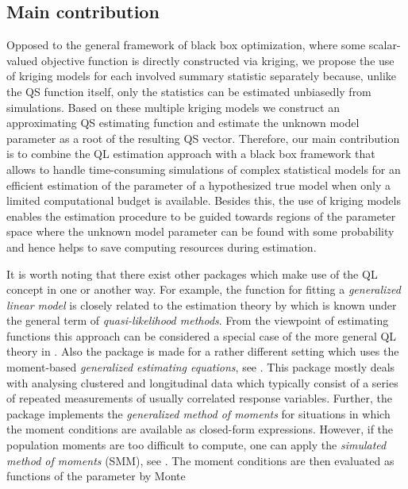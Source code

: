 \subsection{Main contribution}
Opposed to the general framework of black box optimization, where
some scalar-valued objective function is directly constructed via
kriging, we propose the use of kriging models for each involved summary
statistic separately because, unlike the QS function itself, only the statistics can be estimated
unbiasedly from simulations. Based on these multiple kriging models we
construct an approximating QS estimating function and estimate the unknown model parameter as a root
of the resulting QS vector. Therefore, our main contribution is to combine the
QL estimation approach with a black box framework that allows to handle time-consuming simulations
of complex statistical models for an efficient estimation of the parameter of a
hypothesized true model when only a limited computational budget is available. Besides this, the use
of kriging models enables the estimation procedure to be guided towards regions
of the parameter space where the unknown model parameter can be found with some probability and
hence helps to save computing resources during estimation.\par
%
It is worth noting that there exist other  packages which make use
of the QL concept in one or another way. For example, the function 
\citep{pkg:stats} for fitting a \emph{generalized linear model} is closely
related to the estimation theory by \citet{ref:Wedder1974} which is known
under the general term of \emph{quasi-likelihood methods}. From the viewpoint of
estimating functions this approach can be considered a special case of the
more general QL theory in \citet{ref:Heyde1997}. Also the package 
\citep{pkg:gee} is made for a rather different setting which uses the
moment-based \emph{generalized estimating equations}, see \citet{ref:Liang1986}.
This package mostly deals with analysing clustered and longitudinal data which
typically consist of a series of repeated measurements of usually correlated
response variables. Further, the package  \citep{ref:pkgGMM} implements
the \emph{generalized method of moments} \citep{ref:Hansen1982} for situations
in which the moment conditions are available as closed-form expressions.
However, if the population moments are too difficult to compute, one can apply the
\emph{simulated method of moments} (SMM), see \citet{ref:McFadden1989}. The 
moment conditions are then evaluated as functions of the parameter by Monte
